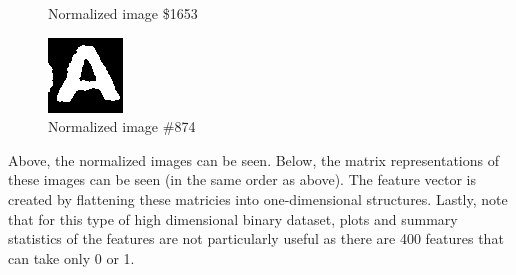 \documentclass{article}
\begin{document}
\begin{figure}[!htb]
  \caption{Normalized image \$1653}\label{fig:awesome_image2}
\endminipage\hfill
{}%
  \includegraphics[width=\linewidth]{874/processed.png}
  \caption{Normalized image \#874 }\label{fig:awesome_image3}
\endminipage
\end{figure}

Above, the normalized images can be seen. Below, the matrix representations of these images can be seen (in the same order as above). The feature vector is created by flattening these matricies into
one-dimensional structures. Lastly, note that for this type of high dimensional binary dataset, plots and summary statistics of the features are not particularly
useful as there are 400 features that can take only 0 or 1.
\end{document}

